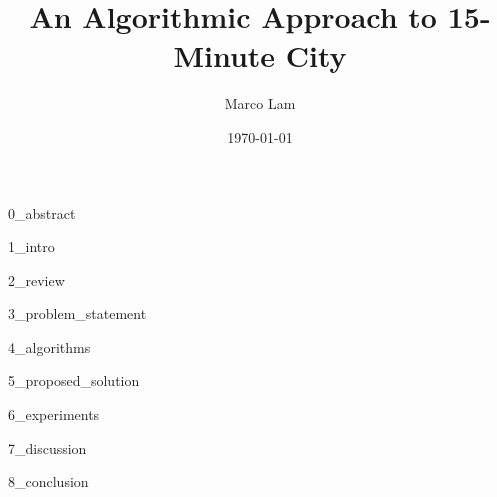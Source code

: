 \documentclass[oneside]{book}
\title{An Algorithmic Approach to 15-Minute City}
\author{Marco Lam}
\date{\today}
\begin{document}
\maketitle

{0_abstract}

\newpage

\tableofcontents
\listoffigures
\listoftables
\listofalgorithms
\newpage

{1_intro}

\newpage

{2_review}

\newpage

{3_problem_statement}

\newpage

{4_algorithms}

\newpage

{5_proposed_solution}

\newpage

{6_experiments}

\newpage

{7_discussion}

\newpage

{8_conclusion}

\newpage


\end{document}
